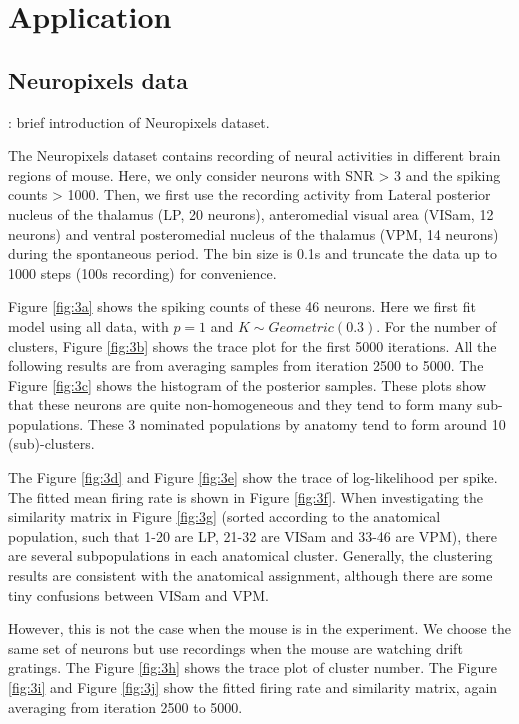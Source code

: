 \documentclass{article}
\begin{document}
	\section{Application}
	\label{app}
	
	\subsection{Neuropixels data}
	\answerTODO{}: brief introduction of Neuropixels dataset.
	
	The Neuropixels dataset contains recording of neural activities in different brain regions of mouse. Here, we only consider neurons with SNR > 3 and the spiking counts > 1000. Then, we first use the recording activity from Lateral posterior nucleus of the thalamus (LP, 20 neurons), anteromedial visual area (VISam, 12 neurons) and ventral posteromedial nucleus of the thalamus (VPM, 14 neurons) during the spontaneous period. The bin size is 0.1s and truncate the data up to 1000 steps (100s recording) for convenience. 
	
	Figure \ref{fig:3a} shows the spiking counts of these 46 neurons. Here we first fit model using all data, with $p=1$ and $K\sim Geometric(0.3)$. For the number of clusters, Figure \ref{fig:3b} shows the trace plot for the first 5000 iterations. All the following results are from averaging samples from iteration 2500 to 5000. The Figure \ref{fig:3c} shows the histogram of the posterior samples. These plots show that these neurons are quite non-homogeneous and they tend to form many sub-populations. These 3 nominated populations by anatomy tend to form around 10 (sub)-clusters.
	
	The Figure \ref{fig:3d} and Figure \ref{fig:3e} show the trace of log-likelihood per spike. The fitted mean firing rate is shown in Figure \ref{fig:3f}. When investigating the similarity matrix in Figure \ref{fig:3g} (sorted according to the anatomical population, such that 1-20 are LP, 21-32 are VISam and 33-46 are VPM), there are several subpopulations in each anatomical cluster. Generally, the clustering results are consistent with the anatomical assignment, although there are some tiny confusions between VISam and VPM.
	
	However, this is not the case when the mouse is in the experiment. We choose the same set of neurons but use recordings when the mouse are watching drift gratings. The Figure \ref{fig:3h} shows the trace plot of cluster number. The Figure \ref{fig:3i} and Figure \ref{fig:3j} show the fitted firing rate and similarity matrix, again averaging from iteration 2500 to 5000.
	
\end{document}

